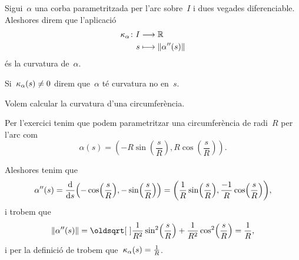 \documentclass[../../main.tex]{subfiles}
\begin{document}
    \begin{definition}[Curvatura]
        \label{def:curvatura}
        Sigui~\(\alpha\) una corba parametritzada per l'arc sobre~\(I\) i dues vegades diferenciable.
        Aleshores direm que l'aplicació
        \begin{align*}
            \curvatura_{\alpha}\colon I&\longrightarrow\mathbb{R} \\
            s&\longmapsto\norm{\alpha''(s)}
        \end{align*}
        és la curvatura de~\(\alpha\).

        Si~\(\operatorname{\kappa}_{\alpha}(s)\neq0\) direm que~\(\alpha\) té curvatura no \nulla{} en~\(s\).
    \end{definition}
    \begin{example}
        \label{ex:curvatura de la circumferència}
        Volem calcular la curvatura d'una circumferència.%
        \begin{solution}
            Per l'exercici  tenim que podem parametritzar una circumferència de radi~\(R\) per l'arc com
            \[
                \alpha(s)=\left(-R\sin\left(\frac{s}{R}\right),R\cos\left(\frac{s}{R}\right)\right).
            \]

            Aleshores tenim que
            \[
                \alpha''(s)=\frac{\diff}{\diff s}\left(-\cos\left(\frac{s}{R}\right),-\sin\left(\frac{s}{R}\right)\right)=\left(\frac{1}{R}\sin\left(\frac{s}{R}\right),\frac{-1}{R}\cos\left(\frac{s}{R}\right)\right),
            \]
            i trobem que
            \[
                \norm{\alpha''(s)}=\sqrt{\frac{1}{R^{2}}\sin^{2}\left(\frac{s}{R}\right)+\frac{1}{R^{2}}\cos^{2}\left(\frac{s}{R}\right)}=\frac{1}{R},
            \]
            i per la definició de  trobem que~\(\operatorname{\kappa}_{\alpha}(s)=\frac{1}{R}\).
        \end{solution}
    \end{example}
\end{document}
